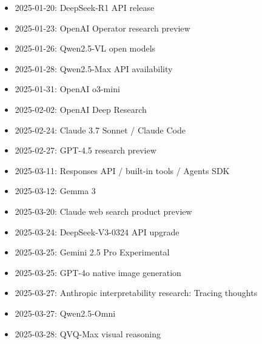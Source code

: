 
\begin{itemize}
  \item 2025-01-20: DeepSeek-R1 API release \autocite{src-8f8555b73e1b}
  \item 2025-01-23: OpenAI Operator research preview \autocite{src-95b210494c88}
  \item 2025-01-26: Qwen2.5-VL open models \autocite{src-dc21f366b638}
  \item 2025-01-28: Qwen2.5-Max API availability \autocite{src-8c485019ad8d}
  \item 2025-01-31: OpenAI o3-mini \autocite{src-650b567698aa}
\end{itemize}

\begin{itemize}
  \item 2025-02-02: OpenAI Deep Research \autocite{src-8fec3ef3a97d}
  \item 2025-02-24: Claude 3.7 Sonnet / Claude Code \autocite{src-a6c92f94a0af}
  \item 2025-02-27: GPT-4.5 research preview \autocite{src-3fa7f4cd510b}
\end{itemize}

\begin{itemize}
  \item 2025-03-11: Responses API / built-in tools / Agents SDK \autocite{src-78593f4b387f}
  \item 2025-03-12: Gemma 3 \autocite{src-1bb16d7254b1}
  \item 2025-03-20: Claude web search product preview \autocite{src-6e15bd50b7db}
  \item 2025-03-24: DeepSeek-V3-0324 API upgrade \autocite{src-8f8555b73e1b}
  \item 2025-03-25: Gemini 2.5 Pro Experimental \autocite{src-421ee9af3f80}
  \item 2025-03-25: GPT-4o native image generation \autocite{src-877e7da88408}
  \item 2025-03-27: Anthropic interpretability research: Tracing thoughts \autocite{src-fdc10e3226e6}
  \item 2025-03-27: Qwen2.5-Omni \autocite{src-de4ffd746276}
  \item 2025-03-28: QVQ-Max visual reasoning \autocite{src-8cb736b33646}
\end{itemize}

